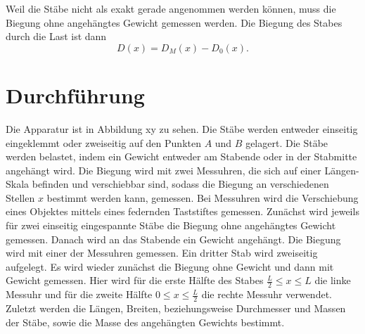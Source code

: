 \noindent Weil die Stäbe nicht als exakt gerade angenommen werden können,
muss die Biegung ohne angehängtes Gewicht gemessen werden.
Die Biegung des Stabes durch die Last ist dann 
\begin{equation}
D(x) = D_{M}(x) - D_{0}(x).
\label{eqn:D(x)}
\end{equation}
\section{Durchführung}
Die Apparatur ist in Abbildung xy zu sehen. %
Die Stäbe werden entweder einseitig eingeklemmt oder zweiseitig
auf den Punkten $A$ und $B$ gelagert. Die Stäbe werden belastet, indem
ein Gewicht entweder am Stabende oder in der Stabmitte angehängt wird.
Die Biegung wird mit zwei Messuhren, die sich auf einer Längen-Skala befinden
und verschiebbar sind, sodass die Biegung an verschiedenen Stellen $x$ bestimmt
werden kann, gemessen. Bei Messuhren wird die Verschiebung eines Objektes mittels
eines federnden Taststiftes gemessen. %
Zunächst wird jeweils für zwei einseitig eingespannte Stäbe die Biegung ohne
angehängtes Gewicht gemessen. Danach wird an das Stabende ein Gewicht angehängt.
Die Biegung wird mit einer der Messuhren gemessen. %
Ein dritter Stab wird
zweiseitig aufgelegt. Es wird wieder zunächst die Biegung ohne Gewicht und dann
mit Gewicht gemessen. Hier wird für die erste Hälfte des Stabes $\frac{L}{2} \leq x \leq L$
die linke Messuhr und für die zweite Hälfte $0 \leq x \leq \frac{L}{2}$ die rechte Messuhr
verwendet. %
Zuletzt werden die Längen, Breiten, beziehungsweise Durchmesser und Massen der Stäbe,
sowie die Masse des angehängten Gewichts bestimmt.





\nocite{*}
\newpage
\printbibliography

